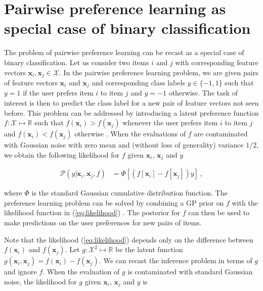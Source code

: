 \section{Pairwise preference learning as special case of binary classification}\label{sec:prefKernel}

The problem of pairwise preference learning can be recast as a special case of binary classification.
Let us consider two items $i$ and $j$ with corresponding feature vectors $\mathbf{x}_i,\mathbf{x}_j\in\mathcal{X}$.
In the pairwise preference learning problem, we are given pairs of feature vectors $\mathbf{x}_i$ and $\mathbf{x}_j$
and corresponding class labels $y\in\{-1,1\}$ such that $y=1$ if the user prefers item $i$ to item $j$
and $y=-1$ otherwise. The task of interest is then to predict the class label for a new pair of feature vectors
not seen before.
This problem can be addressed by introducing a latent preference function $f:\mathcal{X}\mapsto \mathbb{R}$ such that
$f(\mathbf{x}_i) > f(\mathbf{x}_j)$ whenever the user prefers item $i$ to item $j$
and $f(\mathbf{x}_i) < f(\mathbf{x}_j)$ otherwise \cite{chu2005}.
When the evaluations of $f$ are contaminated with Gaussian
noise with zero mean and (without loss of generality) variance $1/2$, we obtain the following likelihood for $f$
given $\mathbf{x}_i$, $\mathbf{x}_j$ and $y$

\vspace{-0.65cm}
{\small
\begin{align}
\mathcal{P}(y|\mathbf{x}_i,\mathbf{x}_j,f) &= \Phi[(f[\mathbf{x}_i] - f[\mathbf{x}_j])y]\,,\label{eq:likelihood}
\end{align}
}

\vspace{-0.7cm}
\normalsize where $\Phi$ is the standard Gaussian cumulative distribution function.
The preference learning problem can be solved by combining a GP prior on $f$
with the likelihood function in (\ref{eq:likelihood}) \cite{chu2005}. The posterior for $f$ can
then be used to make predictions on the user preferences for new pairs of items.

Note that the likelihood (\ref{eq:likelihood}) depends only on the difference between $f(\mathbf{x}_i)$ and $f(\mathbf{x}_j)$.
Let $g:\mathcal{X}^2\mapsto\mathbb{R}$ be the latent function $g(\mathbf{x}_i,\mathbf{x}_j) = f(\mathbf{x}_i) - f(\mathbf{x}_j)$.
We can recast the inference problem in terms of $g$ and ignore $f$. When the evaluation of $g$ is contaminated with standard Gaussian noise,
the likelihood for $g$ given $\mathbf{x}_i$, $\mathbf{x}_j$ and $y$ is

